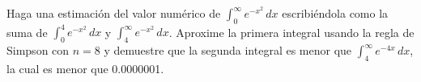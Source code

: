 \item Haga una estimación del valor numérico de $\int_{0}^{\infty} e^{-x^2} \, dx$ escribiéndola como la suma de $\int_{0}^{4} e^{-x^2} \, dx$ y $\int_{4}^{\infty} e^{-x^2} \, dx$. Aproxime la primera integral usando la regla de Simpson con $n = 8$ y demuestre que la segunda integral es menor que $\int_{4}^{\infty} e^{-4x} \, dx$, la cual es menor que 0.0000001.
